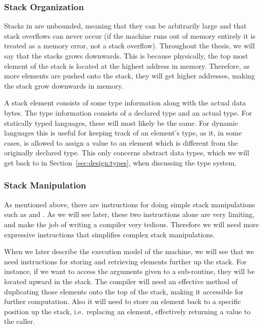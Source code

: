 \subsubsection{Stack Organization}

Stacks in \thename{} are unbounded, meaning that they can be arbitrarily large
and that stack overflows can never occur (if the machine runs out of memory
entirely it is treated as a memory error, not a stack overflow). Throughout the
thesis, we will say that the stacks grows downwards. This is because physically,
the top most element of the stack is located at the highest address in
memory. Therefore, as more elements are pushed onto the stack, they will get
higher addresses, making the stack grow downwards in memory.

A stack element consists of some type information along with the actual data
bytes. The type information consists of a declared type and an actual type. For
statically typed languages, these will most likely be the same. For dynamic
languages this is useful for keeping track of an element's type, as it, in some
cases, is allowed to assign a value to an element which is different from the
originally declared type. This only concerns abstract data types, which we will
get back to in Section~\ref{sec:design:types}, when discussing the type system.

\subsubsection{Stack Manipulation}

As mentioned above, there are instructions for doing simple stack manipulations
such as  and . As we will see later, these two instructions
alone are very limiting, and make the job of writing a compiler very
tedious. Therefore we will need more expressive instructions that simplifies
complex stack manipulations.

When we later describe the execution model of the machine, we will see that we
need instructions for storing and retrieving elements further up the stack. For
instance, if we want to access the arguments given to a sub-routine, they will
be located upward in the stack. The compiler will need an effective method of
duplicating those elements onto the top of the stack, making it accessible for
further computation. Also it will need to store an element back to a specific
position up the stack, i.e.~replacing an element, effectively returning a value
to the caller.

